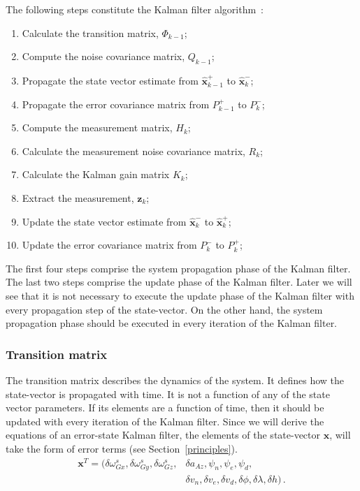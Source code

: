 \documentclass[journal]{IEEEtran}
\begin{document}
The following steps constitute the Kalman filter algorithm~\cite{farrell1999global}:
\begin{enumerate}
    \item Calculate the transition matrix, $\Phi_{k-1}$;
	\item Compute the noise covariance matrix, $Q_{k-1}$;
    \item Propagate the state vector estimate from $\hat{\boldsymbol{x}}_{k-1}^+$ to $\hat{\boldsymbol{x}}_{k}^-$;
     \item Propagate the error covariance matrix from $P_{k-1}^+$ to $P_k^-$;
     \item Compute the measurement matrix, $H_k$;
     \item Calculate the measurement noise covariance matrix, $R_k$;
       \item Calculate the Kalman gain matrix $K_k$;
     \item Extract the measurement, $\boldsymbol{z}_k$;
     \item Update the state vector estimate from $\hat{\boldsymbol{x}}_k^-$ to $\hat{\boldsymbol{x}}_k^+$;
     \item Update the error covariance matrix from $P_k^-$ to $P_k^+$;
\end{enumerate}

The first four steps comprise the system propagation phase of the Kalman filter. The last two steps comprise the update phase of the Kalman filter. Later we will see that it is not necessary to execute the update phase of the Kalman filter with every propagation step of the state-vector.
On the other hand, the system propagation phase should be executed in every iteration  of the Kalman filter. \par


%
\subsubsection{Transition matrix}
The transition matrix describes the dynamics of the system. It defines how the state-vector is propagated with time. It is not a function of any of the state vector parameters. If its elements are a function of time, then it should be updated with every iteration of the Kalman filter.
Since we will derive the equations of an error-state Kalman filter, the elements of the state-vector $\boldsymbol{x}$, will take the form of error terms (see Section~\ref{principles}). 
\begin{equation}
  \label{eq_statevector}
  \begin{split}
    \boldsymbol{x}^T=(\delta\omega_{Gx}^s,\delta\omega_{Gy}^s ,\delta\omega_{Gz}^s,&\delta{a}_{Az},{\psi}_n,{\psi}_e,{\psi}_d,\\
    &\delta v_n,\delta v_e,\delta v_d,\delta\phi,\delta\lambda,\delta h)\,.
\end{split}
\end{equation}
\end{document}
